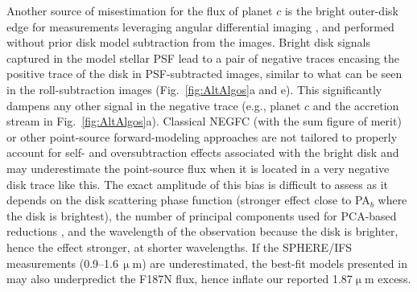 \documentclass[longauth]{aa}
\begin{document}
\begin{appendix}
Another source of misestimation for the flux of planet $c$ is the bright outer-disk edge for measurements leveraging 
angular differential imaging %
\citep{Marois2006}, and performed without prior disk model subtraction from the images.
Bright disk signals captured in the model stellar PSF %
lead to a pair of negative traces encasing the positive trace of the disk in PSF-subtracted images, similar to what can be seen in the roll-subtraction images (Fig.~\ref{fig:AltAlgos}a and e). This significantly dampens any other signal in the negative trace (e.g., planet $c$ and the accretion stream in Fig.~\ref{fig:AltAlgos}a). 
Classical NEGFC (with the sum figure of merit) or other point-source forward-modeling approaches are not tailored to properly account for self- and oversubtraction effects associated with the bright disk and may underestimate the point-source flux when it is located in a very negative disk trace like this. %
The exact amplitude of this bias is difficult to assess as it depends on the disk scattering phase function (stronger effect close to PA$_b$ where the disk is brightest), the number of principal components used for PCA-based reductions \citep[see e.g., Fig.~2 in][]{Juillard2022}, and the wavelength of the observation because the %
disk is brighter, hence the effect stronger, at shorter wavelengths. %
If the SPHERE/IFS measurements (0.9--1.6\,$\upmu$m) are underestimated, the best-fit models presented in \citet{Wang2021} may also underpredict the F187N flux, hence inflate our reported 1.87$\upmu$m excess. %


\end{appendix}
\end{document}
